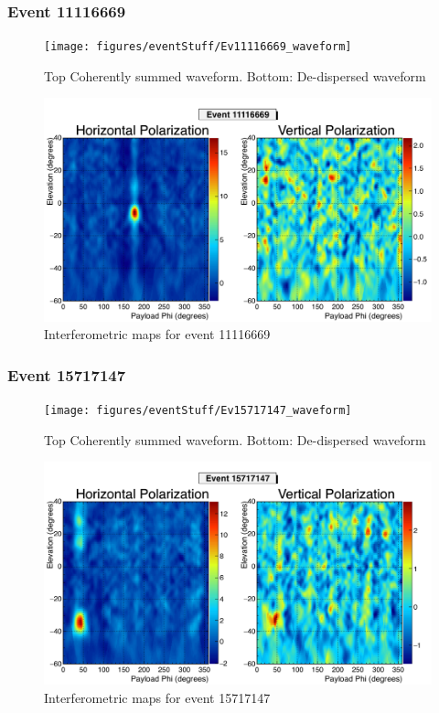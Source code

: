 		\subsubsection{Event 11116669}
		\begin{figure}
		\centering
			\texttt{[image: figures/eventStuff/Ev11116669\_waveform]}
			\caption{Top Coherently summed waveform.  Bottom: De-dispersed waveform} 
		\label{fig:Ev11116669_waveform}
		\end{figure}
		
		\begin{figure}
		\centering
			\includegraphics[width=\textwidth]{figures/intMap/intMap_ev11116669}
			\caption{Interferometric maps for event 11116669} 
		\label{fig:Ev11116669_map}
		\end{figure}			
	
		\subsubsection{Event 15717147}
		\begin{figure}
		\centering
			\texttt{[image: figures/eventStuff/Ev15717147\_waveform]}
			\caption{Top Coherently summed waveform.  Bottom: De-dispersed waveform} 
		\label{fig:Ev15717147_waveform}
		\end{figure}
		
		\begin{figure}
		\centering
			\includegraphics[width=\textwidth]{figures/intMap/intMap_ev15717147}
			\caption{Interferometric maps for event 15717147} 
		\label{fig:Ev15717147_map}
		\end{figure}			
	
